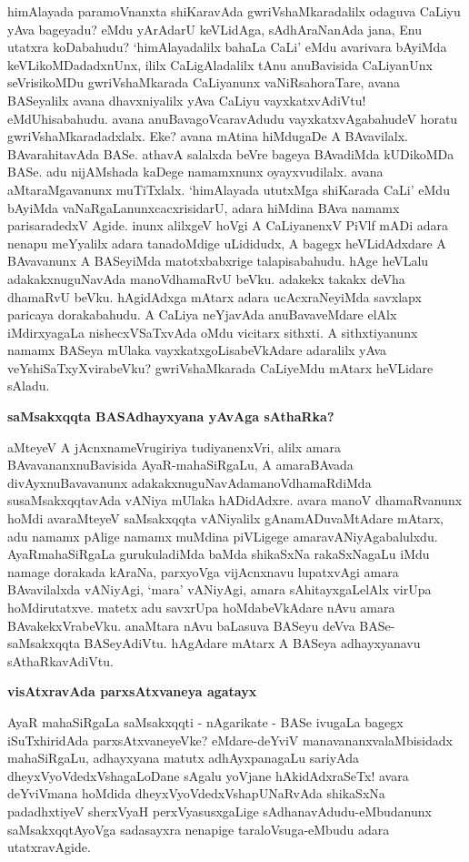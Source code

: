 himAlayada paramoVnanxta shiKaravAda gwriVshaMkaradalilx odaguva CaLiyu yAva bageyadu? eMdu yArAdarU keVLidAga, sAdhAraNanAda jana, Enu utatxra koDabahudu?  `himAlayadalilx bahaLa CaLi' eMdu avarivara bAyiMda keVLikoMDadadxnUnx, ililx CaLigAladalilx tAnu anuBavisida CaLiyanUnx seVrisikoMDu gwriVshaMkarada CaLiyanunx vaNiRsahoraTare, avana BASeyalilx avana dhavxni\-yalilx yAva CaLiyu vayxkatxvAdiVtu! eMdUhisabahudu. avana anuBavagoVcaravAdudu vayxkatx\-vAga\-bahudeV horatu gwriVshaMkaradadxlalx. Eke? avana mAtina hiMdugaDe A BAvavilalx. BAva\-rahita\-vAda BASe. athavA salalxda beVre bageya BAvadiMda kUDikoMDa BASe. adu nijAMshada kaDege \-namamxnunx oyayxvudilalx. avana aMtaraMgavanunx muTiTxlalx. `himAlayada ututxMga shiKarada CaLi' eMdu bAyiMda\- vaNaRgaLanunxcacxrisidarU, adara hiMdina BAva namamx parisaradedxV Agide. inunx alilxgeV hoVgi A CaLi\-yanenxV PiVlf mADi adara nenapu meYyalilx adara tanadoMdige uLididudx, A bagegx heVLidAdxdare A BAva\-vanunx A BASeyiMda matotxbabxrige talapisabahudu. hAge heVLalu adakakxnuguNavAda manoV\-dhamaRvU beVku. adakekx takakx deVha dhamaRvU beVku. hAgidAdxga mAtarx adara ucAcxraNeyiMda savxlapx pari\-caya dorakabahudu. A CaLiya neYjavAda anuBavaveMdare elAlx iMdirxyagaLa nishecxVSaTxvAda oMdu vicitarx sithxti. A sithxtiyanunx namamx BASeya mUlaka vayxkatxgoLisabeVkAdare adaralilx yAva veYshiSaTxyXvirabeVku? gwriVshaMkarada CaLiyeMdu mAtarx heVLidare sAladu.

{\bigskip
\noindent
{\large\bf saMsakxqqta BASAdhayxyana yAvAga sAthaRka?}}\label{page27}
\medskip

\noindent
aMteyeV A jAcnxnameVrugiriya tudiyanenxVri, alilx amara BAvavananxnu\-Bavisida AyaR-maha\-SiRgaLu, A amaraBAvada divAyxnuBavavanunx adakakxnuguNavAda\break manoVdhamaRdiMda susaMsakxqqtavAda vANiya mUlaka hADidAdxre. avara manoV dhamaRvanunx hoMdi avaraMteyeV saMsakxqqta vANiyalilx \-gAnamADu\-vaMtAdare mAtarx, adu namamx pAlige namamx muMdina piVLigege amaravANiyAgabalulxdu. \-AyaR\-mahaSiRgaLa gurukuladiMda baMda shikaSxNa rakaSxNagaLu iMdu namage dora\-kada kAraNa, parxyoVga
vijAcnx\-navu lupatxvAgi amara BAvavilalxda vANiyAgi, `mara' vANiyAgi, amara sAhitayxgaLelAlx virUpa hoMdirutatxve. matetx adu savxrUpa hoMdabeVkAdare nAvu amara BAvakekxVrabeVku. anaMtara nAvu baLasuva BASeyu deVva BASe-saMsakxqqta BASeyAdiVtu. hAgAdare mAtarx A BASeya adhayx\-yanavu sAthaRkavAdiVtu.

{\bigskip
\noindent
{\large\bf visAtxravAda parxsAtxvaneya agatayx}}\label{page27}
\medskip

\noindent
AyaR mahaSiRgaLa saMsakxqqti - nAgarikate - BASe ivugaLa bagegx iSuTxhiridAda parxsAtxvaneyeVke? eMdare-deYviV manavananxvalaMbisidadx mahaSiRgaLu, adhayxyana matutx adhAyxpanagaLu sariyAda dheyxVyoV\-dedxVsha\-gaLoDane sAgalu yoVjane hAkidAdxraSeTx! avara deYviVmana hoMdida dheyxVyoVdedxVsha\-pUNaR\-vAda shikaSxNa padadhxtiyeV sherxVyaH perxVyasusxgaLige sAdhanavAdudu-eMbudanunx saMsakxqqtAyoVga sadasayxra nena\-pige taraloVsuga-eMbudu adara utatxravAgide.

